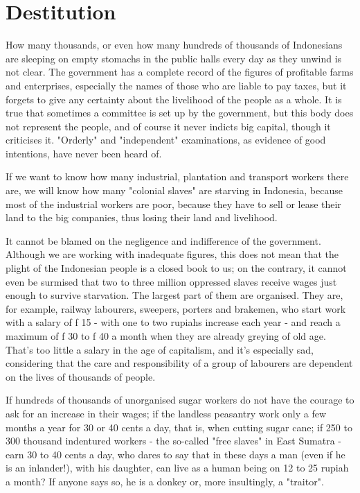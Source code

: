\section{Destitution}

How many thousands, or even how many hundreds of thousands of Indonesians are 
sleeping on empty stomachs in the public halls every day as they unwind is not clear. 
The government has a complete record of the figures of profitable farms and enterprises, 
especially the names of those who are liable to pay taxes, but it forgets to give 
any certainty about the livelihood of the people as a whole. It is true that sometimes a 
committee is set up by the government, but this body does not represent the people, and of 
course it never indicts big capital, though it criticises it. "Orderly" and "independent" 
examinations, as evidence of good intentions, have never been heard of.\vskip 0.2in

If we want to know how many industrial, plantation and transport workers 
there are, we will know how many "colonial slaves" are starving in Indonesia, 
because most of the industrial workers are poor, because they have to sell or 
lease their land to the big companies, thus losing their land and livelihood.\vskip 0.2in

It cannot be blamed on the negligence and indifference of the government. 
Although we are working with inadequate figures, this does not mean that the 
plight of the Indonesian people is a closed book to us; on the contrary, 
it cannot even be surmised that two to three million oppressed slaves receive 
wages just enough to survive starvation. The largest part of them are organised. 
They are, for example, railway labourers, sweepers, porters and brakemen, who start 
work with a salary of f 15 - with one to two rupiahs increase each year - and 
reach a maximum of f 30 to f 40 a month when they are already greying of old age. 
That's too little a salary in the age of capitalism, and it's especially sad, considering 
that the care and responsibility of a group of labourers are dependent on the lives of thousands of people.\vskip 0.2in

If hundreds of thousands of unorganised sugar workers do not have the courage 
to ask for an increase in their wages; if the landless peasantry work only a 
few months a year for 30 or 40 cents a day, that is, when cutting sugar cane; 
if 250 to 300 thousand indentured workers - the so-called "free slaves" in East 
Sumatra - earn 30 to 40 cents a day, who dares to say that in these days a man 
(even if he is an inlander!), with his daughter, can live as a human being on 
12 to 25 rupiah a month? If anyone says so, he is a donkey or, more insultingly, a "traitor".\vskip 0.2in

